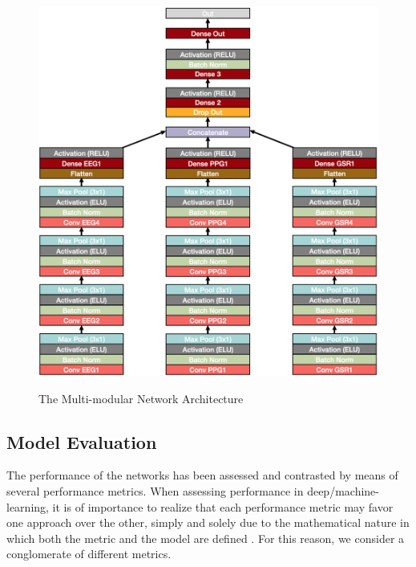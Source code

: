 \documentclass[12pt]{article}
\begin{document}
\begin{figure}
\caption{The Multi-modular Network Architecture}
\bigskip
\includegraphics[scale=0.69]{multi_model_architecture}
\label{fig:multiarchitecture}
\end{figure}
\restoregeometry

\newpage
\subsection{Model Evaluation}
The performance of the networks has been assessed and contrasted by means of several performance metrics. When assessing performance in deep/machine-learning, it is of importance to realize that each performance metric may favor one approach over the other, simply and solely due to the mathematical nature in which both the metric and the model are defined \cite{gunawardana2009survey}. For this reason, we consider a conglomerate of different metrics. 
\end{document}
